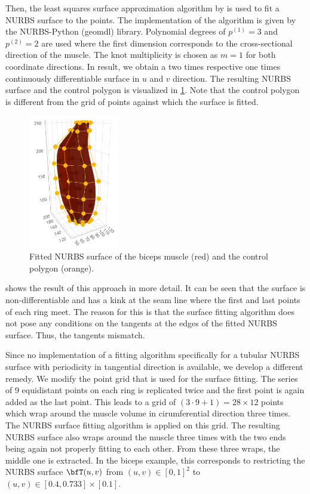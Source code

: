 Then, the least squares surface approximation algorithm by \cite{piegl2012nurbs} is used to fit a NURBS surface to the points. The implementation of the algorithm is given by the NURBS-Python (geomdl) library. Polynomial degrees of $p^{(1)} = 3$ and $p^{(2)}=2$ are used where the first dimension corresponds to the cross-sectional direction of the muscle. The knot multiplicity is chosen as $m=1$ for both coordinate directions. In result, we obtain a two times respective one times continuously differentiable surface in $u$ and $v$ direction. 
The resulting NURBS surface and the control polygon is visualized in \cref{fig:biceps_splines_control_points}. Note that the control polygon is different from the grid of points against which the surface is fitted.
%
\begin{figure}%
  \centering%
  \includegraphics[width=0.35\textwidth]{images/fiber_creation/splines01red.png}%
  \caption{Fitted NURBS surface of the biceps muscle (red) and the control polygon (orange).}%
  \label{fig:biceps_splines_control_points}%
\end{figure}%

 shows the result of this approach in more detail. It can be seen that the surface is non-differentiable and has a kink at the seam line where the first and last points of each ring meet. The reason for this is that the surface fitting algorithm does not pose any conditions on the tangents at the edges of the fitted NURBS surface.  Thus, the tangents mismatch.

Since no implementation of a fitting algorithm specifically for a tubular NURBS surface with periodicity in tangential direction is available, we develop a different remedy. We modify the point grid that is used for the surface fitting. The series of 9 equidistant points on each ring is replicated twice and the first point is again added as the last point. This leads to a grid of $(3\cdot 9+1) = 28 \times 12$ points which wrap around the muscle volume in cirumferential direction three times. The NURBS surface fitting algorithm is applied on this grid. The resulting NURBS surface also wraps around the muscle three times with the two ends being again not properly fitting to each other. From these three wraps, the middle one is extracted. In the biceps example, this corresponds to restricting the NURBS surface $\bfT(u,v)$ from $(u,v) \in [0,1]^2$ to $(u,v) \in [0.4,0.733]\times [0.1]$.

